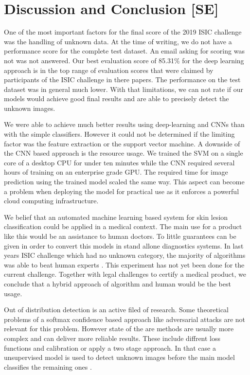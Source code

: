 
\section{Discussion and Conclusion [SE]}\label{sec:conclusion}

One of the most important factors for the final score of the 2019 ISIC challenge was the handling of unknown data. At the time of writing, we do not have a performance score for the complete test dataset. An email asking for scoring was not was not answered. Our best evaluation score of 85.31\% for the deep learning approach is in the top range of evaluation scores that were claimed by participants of the ISIC challenge in there papers. The performance on the test dataset was in general much lower. 
With that limitations, we can not rate if our models would achieve good final results and are able to precisely detect the unknown images. 


We were able to achieve much better results using deep-learning and CNNs than with the simple classifiers. However it could not be determined if the limiting factor was the feature extraction or the support vector machine. A downside of the CNN based approach is the resource usage. We trained the SVM on a single core of a desktop CPU for under ten minutes while the CNN required several hours of training on an enterprise grade GPU. The required time for image prediction using the trained model scaled the same way. This aspect can become a problem when deploying the model for practical use as it enforces a powerful cloud computing infrastructure. 

We belief that an automated machine learning based system for skin lesion classification could be applied in a medical context. The main use for a product like this would be an assistance to human doctors. To little guarantees can be given in order to convert this models in stand allone diagnostics systems. In last years ISIC challenge which had no unknown category, the majority of algorithms was able to beat human experts \cite{TSCHANDL2019938}. This experiment has not yet been done for the current challenge. Together with legal challenges to certify a medical product, we conclude that a hybrid approach of algorithm and human would be the best usage. 	

Out of distribution detection is an active filed of research. Some theoretical problems of a softmax confidence based approach like adversarial attacks \cite{lee2018simple} are not relevant for this problem. However state of the are methods are usually more complex and can deliver more reliable results. These include diffrent loss functions and calibration or apply a two stage approach. In that case a unsupervised  model is used to detect unknown images before the main model classifies the remaining ones \cite{daxberger2019bayesian}. 

